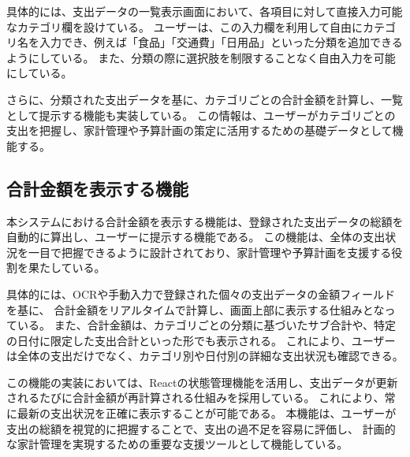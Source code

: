 \documentclass[main]{subfiles}
\begin{document}
具体的には、支出データの一覧表示画面において、各項目に対して直接入力可能なカテゴリ欄を設けている。
ユーザーは、この入力欄を利用して自由にカテゴリ名を入力でき、例えば「食品」「交通費」「日用品」といった分類を追加できるようにしている。
また、分類の際に選択肢を制限することなく自由入力を可能にしている。

さらに、分類された支出データを基に、カテゴリごとの合計金額を計算し、一覧として提示する機能も実装している。
この情報は、ユーザーがカテゴリごとの支出を把握し、家計管理や予算計画の策定に活用するための基礎データとして機能する。

\subsection{合計金額を表示する機能}

本システムにおける合計金額を表示する機能は、登録された支出データの総額を自動的に算出し、ユーザーに提示する機能である。
この機能は、全体の支出状況を一目で把握できるように設計されており、家計管理や予算計画を支援する役割を果たしている。

具体的には、OCRや手動入力で登録された個々の支出データの金額フィールドを基に、
合計金額をリアルタイムで計算し、画面上部に表示する仕組みとなっている。
また、合計金額は、カテゴリごとの分類に基づいたサブ合計や、特定の日付に限定した支出合計といった形でも表示される。
これにより、ユーザーは全体の支出だけでなく、カテゴリ別や日付別の詳細な支出状況も確認できる。

この機能の実装においては、Reactの状態管理機能を活用し、支出データが更新されるたびに合計金額が再計算される仕組みを採用している。
これにより、常に最新の支出状況を正確に表示することが可能である。
本機能は、ユーザーが支出の総額を視覚的に把握することで、支出の過不足を容易に評価し、
計画的な家計管理を実現するための重要な支援ツールとして機能している。
\end{document}
